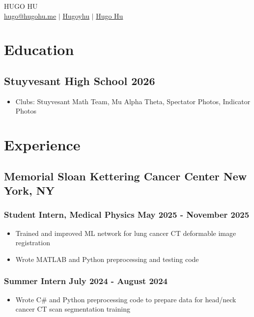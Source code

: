 \documentclass[11pt]{article}
\begin{document}
\begin{center}
    {\fontsize{36}{36}\selectfont\interthin HUGO \interheavy HU} \\ \bigskip
    {\color{icnclr}\faEnvelope[regular]} \href{mailto:hugo@hugohu.me}{hugo@hugohu.me} $|$ 
    {\color{icnclr}\faGithub} \href{https://github.com/Hugoyhu}{Hugoyhu} $|$
    {\color{icnclr}\faLinkedinIn} \href{https://www.linkedin.com/in/hugo-hu-a4a67821a/}{Hugo Hu}
\end{center}

\section{Education}
\subsection{Stuyvesant High School \hfill 2026}
\begin{itemize}
    \item Clubs: Stuyvesant Math Team, Mu Alpha Theta, Spectator Photos, Indicator Photos
\end{itemize}


\section{Experience}
\subsection{Memorial Sloan Kettering Cancer Center \hfill New York, NY}
\subsubsection{Student Intern, Medical Physics \hfill May 2025 - November 2025}
\begin{itemize}
    \item Trained and improved ML network for lung cancer CT deformable image registration
    \item Wrote MATLAB and Python preprocessing and testing code
\end{itemize}
\subsubsection{Summer Intern \hfill July 2024 - August 2024}
\begin{itemize}
    \item Wrote C\# and Python preprocessing code to prepare data for head/neck cancer CT scan segmentation training 
\end{itemize}
\end{document}

